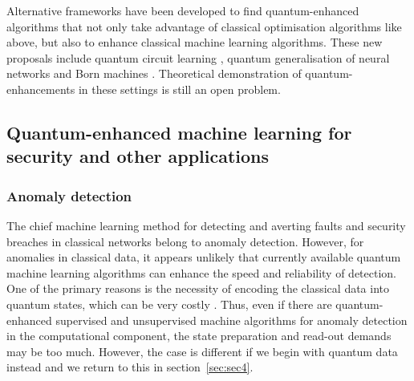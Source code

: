 \documentclass[twocolumn, aps, rmp, amsmath, amssymb, nofootinbib, superscriptaddress, longbibliography, floatfix, table-of-contents, eqsecnum]{revtex4}
\begin{document}
Alternative frameworks have been developed to find quantum-enhanced algorithms that not only take advantage of classical optimisation algorithms like above, but also to enhance classical machine learning algorithms. These new proposals include quantum circuit learning \cite{mitarai2018quantum}, quantum generalisation of neural networks \cite{wan2017quantum} and Born machines \cite{cheng2018information, benedetti2018generative}. Theoretical demonstration of quantum-enhancements in these settings is still an open problem.




\subsection{Quantum-enhanced machine learning for security and other applications}

\subsubsection{Anomaly detection}

The chief machine learning method for detecting and averting faults and security breaches in classical networks belong to anomaly detection. However, for anomalies in classical data, it appears unlikely that currently available quantum machine learning algorithms can enhance the speed and reliability of detection. One of the primary reasons is the necessity of encoding the classical data into quantum states, which can be very costly \cite{aaronson2015read}. Thus, even if there are quantum-enhanced supervised and unsupervised machine algorithms for anomaly detection in the computational component, the state preparation and read-out demands may be too much. However, the case is different if we begin with quantum data instead and we return to this in section~\ref{sec:sec4}.
\end{document}
